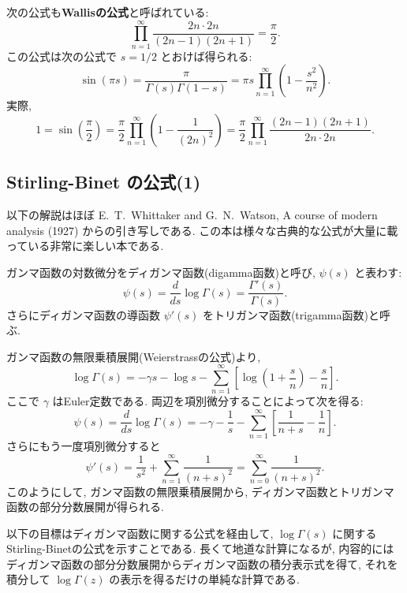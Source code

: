 \documentclass[12pt,twoside]{jarticle}
\theoremstyle{jplain}
\theoremstyle{jplain}
\theoremstyle{jplain}
\numberwithin{theorem}{section}
\numberwithin{equation}{section}
\numberwithin{figure}{section}
\numberwithin{table}{section}
\begin{document}
次の公式も{\bf Wallisの公式}と呼ばれている:
\[
\prod_{n=1}^\infty\frac{2n\cdot 2n}{(2n-1)(2n+1)} = \frac{\pi}{2}.
\] 
この公式は次の公式で $s=1/2$ とおけば得られる:
\[
\sin(\pi s) 
= \frac{\pi}{\Gamma(s)\Gamma(1-s)}
= \pi s\prod_{n=1}^\infty\left(1-\frac{s^2}{n^2}\right).
\]
実際, 
\[
1=\sin\left(\frac{\pi}{2}\right)
=\frac{\pi}{2}\prod_{n=1}^\infty\left(1-\frac{1}{(2n)^2}\right)
=\frac{\pi}{2}\prod_{n=1}^\infty\frac{(2n-1)(2n+1)}{2n\cdot 2n}.
\]


\subsection{Stirling-Binet の公式(1)}
\label{sec:Binet1}

以下の解説はほぼ 
E.~T.~Whittaker and G.~N.~Watson, A course of modern analysis (1927)
からの引き写しである.
この本は様々な古典的な公式が大量に載っている非常に楽しい本である.

ガンマ函数の対数微分をディガンマ函数(digamma函数)と呼び, $\psi(s)$ と表わす:
\[
\psi(s)=\frac{d}{ds}\log\Gamma(s)=\frac{\Gamma'(s)}{\Gamma(s)}.
\]
さらにディガンマ函数の導函数 $\psi'(s)$ をトリガンマ函数(trigamma函数)と呼ぶ.

ガンマ函数の無限乗積展開(Weierstrassの公式)より,
\[
\log\Gamma(s)
=
-\gamma s - \log s 
-\sum_{n=1}^\infty\left[\log\left(1+\frac{s}{n}\right)-\frac{s}{n}\right].
\]
ここで $\gamma$ はEuler定数である.
両辺を項別微分することによって次を得る:
\[
\psi(s)=\frac{d}{ds}\log\Gamma(s)
=
-\gamma - \frac{1}{s} 
-\sum_{n=1}^\infty\left[\frac{1}{n+s}-\frac{1}{n} \right].
\]
さらにもう一度項別微分すると
\[
\psi'(s)
=\frac{1}{s^2}+\sum_{n=1}^\infty\frac{1}{(n+s)^2}
=\sum_{n=0}^\infty\frac{1}{(n+s)^2}.
\]
このようにして, ガンマ函数の無限乗積展開から, 
ディガンマ函数とトリガンマ函数の部分分数展開が得られる.

以下の目標はディガンマ函数に関する公式を経由して, 
$\log\Gamma(s)$ に関するStirling-Binetの公式を示すことである.
長くて地道な計算になるが, 内容的には
ディガンマ函数の部分分数展開からディガンマ函数の積分表示式を得て, 
それを積分して $\log\Gamma(z)$ の表示を得るだけの単純な計算である.
\end{document}
